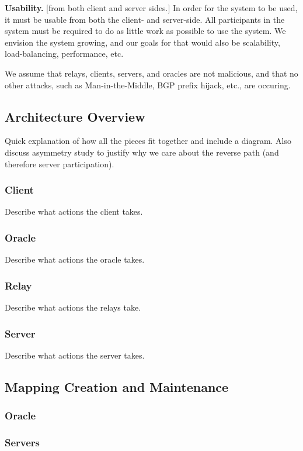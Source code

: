 {\bf Usability.} [from both client and server sides.]  In order for the system to be used, it must be usable from both the client- and server-side.  All participants in the system must be required to do as little work as possible to use the system.  We envision the system growing, and our goals for that would also be scalability, load-balancing, performance, etc.

We assume that relays, clients, servers, and oracles are not malicious, and that no other attacks, such as Man-in-the-Middle, BGP prefix hijack, etc., are occuring.  

\subsection{Architecture Overview}

Quick explanation of how all the pieces fit together and include a diagram.  Also discuss asymmetry study to justify why we care about the reverse path (and therefore server participation).

\subsubsection{Client} Describe what actions the client takes.

\subsubsection{Oracle} Describe what actions the oracle takes.

\subsubsection{Relay} Describe what actions the relays take.

\subsubsection{Server} Describe what actions the server takes.

\subsection{Mapping Creation and Maintenance}

\subsubsection{Oracle}

\subsubsection{Servers}
